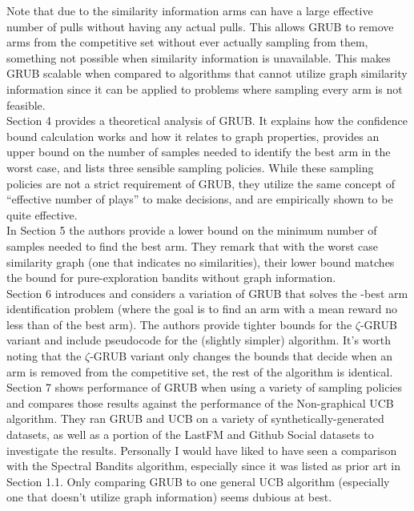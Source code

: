\documentclass{article}[12pt]
\begin{document}
Note that due to the similarity information arms can have a large effective number of pulls without having any actual pulls.
This allows GRUB to remove arms from the competitive set without ever actually sampling from them, something not possible when similarity information is unavailable.
This makes GRUB scalable when compared to algorithms that cannot utilize graph similarity information since it can be applied to problems where sampling every arm is not feasible. \\

Section 4 provides a theoretical analysis of GRUB.
It explains how the confidence bound calculation works and how it relates to graph properties,
provides an upper bound on the number of samples needed to identify the best arm in the worst case,
and lists three sensible sampling policies.
While these sampling policies are not a strict requirement of GRUB,
they utilize the same concept of “effective number of plays” to make decisions,
and are empirically shown to be quite effective. \\

In Section 5 the authors provide a lower bound on the minimum number of samples needed to find the best arm.
They remark that with the worst case similarity graph (one that indicates no similarities),
their lower bound matches the bound for pure-exploration bandits without graph information. \\

Section 6 introduces and considers a variation of GRUB that solves the -best arm identification problem (where the goal is to find an arm with a mean reward no less than of the best arm).
The authors provide tighter bounds for the $\zeta$-GRUB variant and include pseudocode for the (slightly simpler) algorithm.
It’s worth noting that the $\zeta$-GRUB variant only changes the bounds that decide when an arm is removed from the competitive set, the rest of the algorithm is identical. \\

Section 7 shows performance of GRUB when using a variety of sampling policies and compares those results against the performance of the Non-graphical UCB algorithm.
They ran GRUB and UCB on a variety of synthetically-generated datasets, as well as a portion of the LastFM and Github Social datasets to investigate the results.
Personally I would have liked to have seen a comparison with the Spectral Bandits algorithm, especially since it was listed as prior art in Section 1.1.
Only comparing GRUB to one general UCB algorithm (especially one that doesn’t utilize graph information) seems dubious at best. \\
\end{document}
